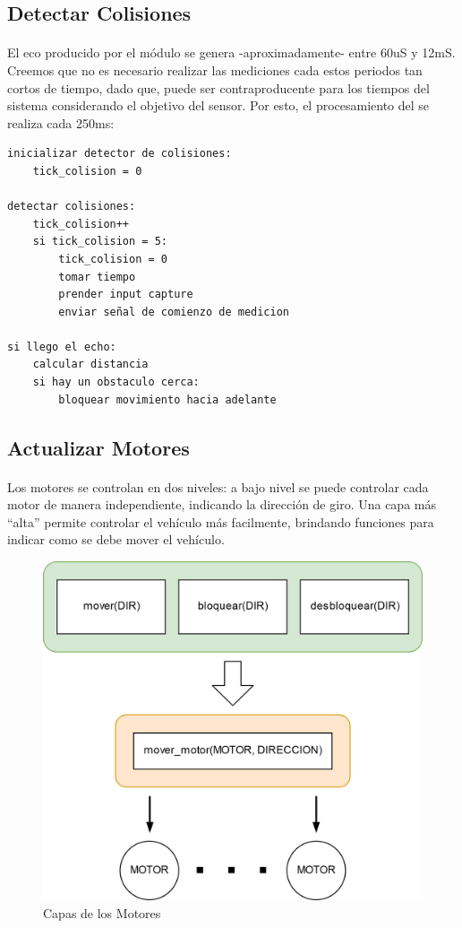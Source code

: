 \subsection{Detectar Colisiones}

\paragraph{}El eco producido por el módulo se genera -aproximadamente- entre 60uS y
12mS. Creemos que no es necesario realizar las mediciones cada estos
periodos tan cortos de tiempo, dado que, puede ser contraproducente para
los tiempos del sistema considerando el objetivo del sensor. Por esto,
el procesamiento del se realiza cada 250ms:

\begin{Verbatim}
inicializar detector de colisiones:
	tick_colision = 0

detectar colisiones:
	tick_colision++
	si tick_colision = 5:
		tick_colision = 0
		tomar tiempo
		prender input capture
		enviar señal de comienzo de medicion

si llego el echo:
	calcular distancia
	si hay un obstaculo cerca:
		bloquear movimiento hacia adelante
\end{Verbatim}

\subsection{Actualizar Motores}

\paragraph{} Los motores se controlan en dos niveles: a bajo nivel se puede controlar cada
motor de manera independiente, indicando la dirección de giro. Una capa
más ``alta'' permite controlar el vehículo más facilmente, brindando
funciones para indicar como se debe mover el vehículo.

\begin{figure}[H]
	\centering
	\includegraphics[width=0.5\linewidth]{informe_2/capas_motor}
	\caption{Capas de los Motores}
	\label{fig:capasmotor}
\end{figure}


